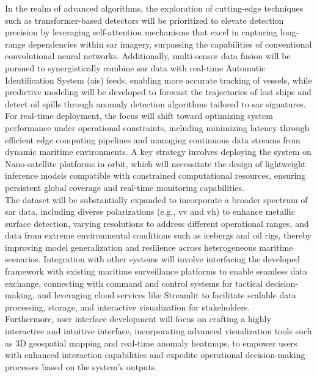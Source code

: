 \documentclass{article}
\begin{document}
In the realm of advanced algorithms, the exploration of cutting-edge techniques such as transformer-based detectors will be prioritized to elevate detection precision by leveraging self-attention mechanisms that excel in capturing long-range dependencies within \acrshort{sar} imagery, surpassing the capabilities of conventional convolutional neural networks. Additionally, multi-sensor data fusion will be pursued to synergistically combine \acrshort{sar} data with real-time Automatic Identification System (\acrshort{ais}) feeds, enabling more accurate tracking of vessels, while predictive modeling will be developed to forecast the trajectories of lost ships and detect oil spills through anomaly detection algorithms tailored to \acrshort{sar} signatures. \\

For real-time deployment, the focus will shift toward optimizing system performance under operational constraints, including minimizing latency through efficient edge computing pipelines and managing continuous data streams from dynamic maritime environments. A key strategy involves deploying the system on Nano-satellite platforms in orbit, which will necessitate the design of lightweight inference models compatible with constrained computational resources, ensuring persistent global coverage and real-time monitoring capabilities. \\

The dataset will be substantially expanded to incorporate a broader spectrum of \acrshort{sar} data, including diverse polarizations (e.g., \acrshort{vv} and \acrshort{vh}) to enhance metallic surface detection, varying resolutions to address different operational ranges, and data from extreme environmental conditions such as icebergs and oil rigs, thereby improving model generalization and resilience across heterogeneous maritime scenarios. Integration with other systems will involve interfacing the developed framework with existing maritime surveillance platforms to enable seamless data exchange, connecting with command and control systems for tactical decision-making, and leveraging cloud services like Streamlit to facilitate scalable data processing, storage, and interactive visualization for stakeholders.\\

Furthermore, user interface development will focus on crafting a highly interactive and intuitive interface, incorporating advanced visualization tools such as 3D geospatial mapping and real-time anomaly heatmaps, to empower users with enhanced interaction capabilities and expedite operational decision-making processes based on the system’s outputs. \newpage
\end{document}
